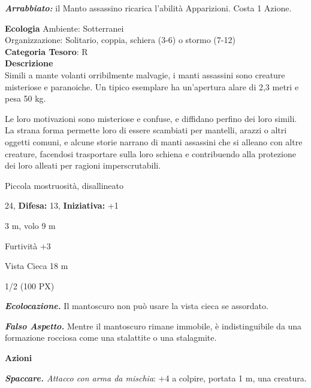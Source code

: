 \begin{multicols}{2}
{\emph{\textbf{Arrabbiato:}} il Manto assassino ricarica l'abilità Apparizioni. Costa 1 Azione.

\textbf{Ecologia}
Ambiente: Sotterranei\\
Organizzazione: Solitario, coppia, schiera (3-6) o stormo (7-12)\\
\textbf{Categoria Tesoro}: R\\
\textbf{Descrizione}\\
Simili a mante volanti orribilmente malvagie, i manti assassini sono creature misteriose e paranoiche. Un tipico esemplare ha un'apertura alare di 2,3 metri e pesa 50 kg.

Le loro motivazioni sono misteriose e confuse, e diffidano perfino dei loro simili. La strana forma permette loro di essere scambiati per mantelli, arazzi o altri oggetti comuni, e alcune storie narrano di manti assassini che si alleano con altre creature, facendosi trasportare sulla loro schiena e contribuendo alla protezione dei loro alleati per ragioni imperscrutabili.

\noindent
\begin{description}[noitemsep, topsep=0pt, parsep=0pt, partopsep=0pt, leftmargin=0cm, labelwidth=2.2cm]
	\item[\textbf{Taglia/Tipo:}] Piccola mostruosità, disallineato
	\item[\textbf{Caratt.:}] 
	\item[\textbf{Punti Ferita:}] 24,  \textbf{Difesa:} 13,  \textbf{Iniziativa:} +1
	\item[\textbf{Movimento:}] 3 m, volo 9 m
	\item[\textbf{Tiri Salvez.:}] 
	\item[\textbf{Comp.:}] Furtività +3
	\item[\textbf{Sensi:}] Vista Cieca 18 m
	\item[\textbf{Sfida:}] 1/2 (100 PX)\smallskip
\end{description}

\emph{\textbf{Ecolocazione.}} Il mantoscuro non può usare la vista cieca se assordato.

\emph{\textbf{Falso Aspetto.}} Mentre il mantoscuro rimane immobile, è indistinguibile da una formazione rocciosa come una stalattite o una stalagmite.

\textbf{Azioni}

\emph{\textbf{Spaccare.} Attacco con arma da mischia}: +4 a colpire, portata 1 m, una creatura.

}
\end{multicols}
